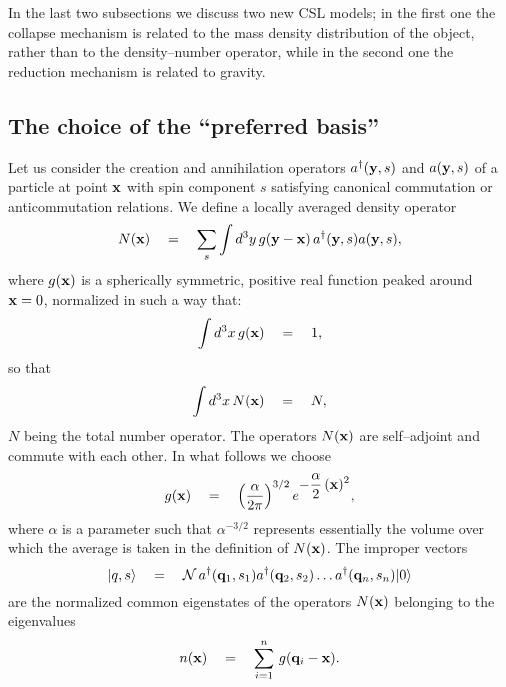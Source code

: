 \documentclass[10pt,a4paper]{article}
\begin{document}
In the last two subsections we discuss two new CSL models; in the
first one the collapse mechanism is related to the mass density
distribution of the object, rather than to the density--number
operator, while in the second one the reduction mechanism is
related to gravity.


\subsection{The choice of the ``preferred basis''} \label{sec71}

Let us consider the creation and annihilation operators
$a^{\dagger}({\bf y}, s)$ and $a({\bf y}, s)$  of a particle at
point ${\bf x}$ with spin component $s$ satisfying canonical
commutation or anticommutation relations. We define a locally
averaged density operator
\begin{equation} \label{ando}
N({\bf x}) \quad = \quad \sum_{s}\int d^{3}y\, g({\bf y} - {\bf
x})\, a^{\dagger}({\bf y}, s)a({\bf y}, s),
\end{equation}
where $g({\bf x})$ is a spherically symmetric, positive real
function peaked around ${\bf x} = 0$, normalized in such a way
that:
\[
\int d^{3}x\, g({\bf x}) \quad = \quad 1,
\]
so that
\[
\int d^{3}x\, N({\bf x}) \quad = \quad N,
\]
$N$ being the total number operator. The operators $N({\bf x})$
are self--adjoint and commute with each other. In what follows we
choose
\begin{equation} \label{gggg}
g({\bf x}) \quad = \quad \left(\frac{\alpha}{2\pi}\right)^{3/2}
e^{\displaystyle -\frac{\alpha}{2}\, ({\bf x})^{2}},
\end{equation}
where $\alpha$ is a parameter such that $\alpha^{-3/2}$ represents
essentially the volume over which the average is taken in the
definition of $N({\bf x})$. The improper vectors
\begin{equation} \label{ces}
|q, s\rangle \quad = \quad {\mathcal N}\, a^{\dagger}({\bf q}_{1},
s_{1}) a^{\dagger}({\bf q}_{2}, s_{2}) \ldots a^{\dagger}({\bf
q}_{n}, s_{n})|0\rangle
\end{equation}
are the normalized common eigenstates of the operators $N({\bf
x})$ belonging to the eigenvalues
\[
n({\bf x}) \quad = \quad \sum_{i=1}^{n}\, g({\bf q}_{i} - {\bf
x}).
\]
\end{document}
